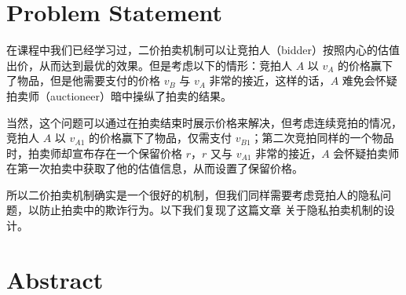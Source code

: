 \section{Problem Statement}

在课程中我们已经学习过，二价拍卖机制可以让竞拍人（bidder）按照内心的估值出价，从而达到最优的效果。但是考虑以下的情形：竞拍人 $A$ 以 $v_A$ 的价格赢下了物品，但是他需要支付的价格 $v_B$ 与 $v_A$ 非常的接近，这样的话，$A$ 难免会怀疑拍卖师（auctioneer）暗中操纵了拍卖的结果。

当然，这个问题可以通过在拍卖结束时展示价格来解决，但考虑连续竞拍的情况，竞拍人 $A$ 以 $v_{A1}$ 的价格赢下了物品，仅需支付 $v_{B1}$；第二次竞拍同样的一个物品时，拍卖师却宣布存在一个保留价格 $r$，$r$ 又与 $v_{A1}$ 非常的接近，$A$ 会怀疑拍卖师在第一次拍卖中获取了他的估值信息，从而设置了保留价格。

所以二价拍卖机制确实是一个很好的机制，但我们同样需要考虑竞拍人的隐私问题，以防止拍卖中的欺诈行为。以下我们复现了这篇文章 \cite{naor1999privacy} 关于隐私拍卖机制的设计。
\section{Abstract}


